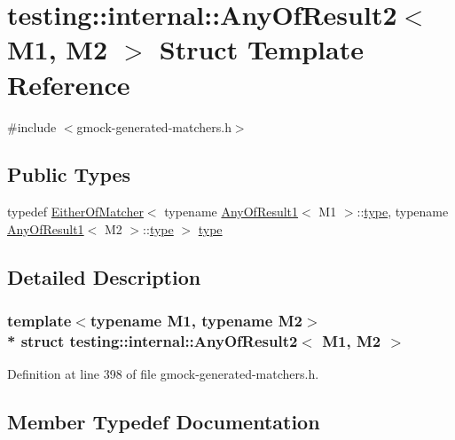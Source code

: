 \hypertarget{structtesting_1_1internal_1_1_any_of_result2}{}\section{testing\+:\+:internal\+:\+:Any\+Of\+Result2$<$ M1, M2 $>$ Struct Template Reference}
\label{structtesting_1_1internal_1_1_any_of_result2}


{\ttfamily \#include $<$gmock-\/generated-\/matchers.\+h$>$}

\subsection*{Public Types}
\begin{DoxyCompactItemize}
\item 
typedef \hyperlink{classtesting_1_1internal_1_1_either_of_matcher}{Either\+Of\+Matcher}$<$ typename \hyperlink{structtesting_1_1internal_1_1_any_of_result1}{Any\+Of\+Result1}$<$ M1 $>$\+::\hyperlink{structtesting_1_1internal_1_1_any_of_result2_a6d9eba508021f8e652c7c154a649073f}{type}, typename \hyperlink{structtesting_1_1internal_1_1_any_of_result1}{Any\+Of\+Result1}$<$ M2 $>$\+::\hyperlink{structtesting_1_1internal_1_1_any_of_result2_a6d9eba508021f8e652c7c154a649073f}{type} $>$ \hyperlink{structtesting_1_1internal_1_1_any_of_result2_a6d9eba508021f8e652c7c154a649073f}{type}
\end{DoxyCompactItemize}


\subsection{Detailed Description}
\subsubsection*{template$<$typename M1, typename M2$>$\\*
struct testing\+::internal\+::\+Any\+Of\+Result2$<$ M1, M2 $>$}



Definition at line 398 of file gmock-\/generated-\/matchers.\+h.



\subsection{Member Typedef Documentation}
